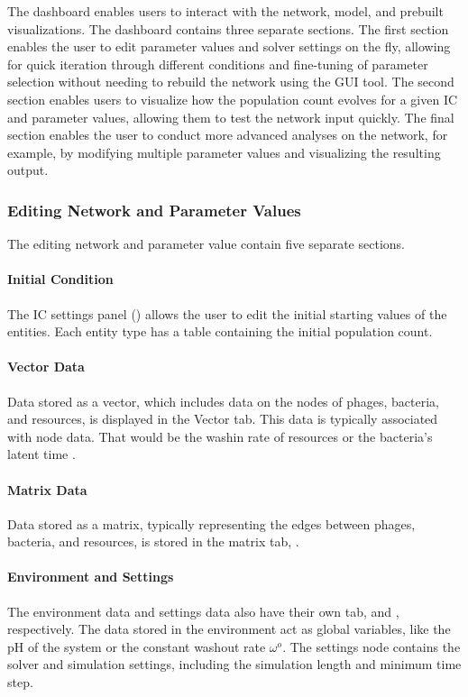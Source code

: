 The dashboard enables users to interact with the network, model, and prebuilt visualizations. The dashboard contains three separate sections.
The first section enables the user to edit parameter values and solver settings on the fly, allowing for quick iteration through different conditions and fine-tuning of parameter selection without needing to rebuild the network using the GUI tool.
The second section enables users to visualize how the population count evolves for a given IC and parameter values, allowing them to test the network input quickly.
The final section enables the user to conduct more advanced analyses on the network, for example, by modifying multiple parameter values and visualizing the resulting output. 

\subsubsection{Editing Network and Parameter Values}
\label{sec:editing_network_and_parameter_values}
The editing network and parameter value contain five separate sections.
\paragraph{Initial Condition}
The IC settings panel () allows the user to edit the initial starting values of the entities. 
Each entity type has a table containing the initial population count. 
\paragraph{Vector Data} 
Data stored as a vector, which includes data on the nodes of phages, bacteria, and resources, is displayed in the Vector tab. 
This data is typically associated with node data. 
That would be the washin rate of resources or the bacteria's latent time .

\paragraph{Matrix Data}
Data stored as a matrix, typically representing the edges between phages, bacteria, and resources, is stored in the matrix tab, .

\paragraph{Environment and Settings}
The environment data and settings data also have their own tab,  and , respectively. 
The data stored in the environment act as global variables, like the pH of the system or the constant washout rate $\omega^o$. 
The settings node contains the solver and simulation settings, including the simulation length and minimum time step. 

